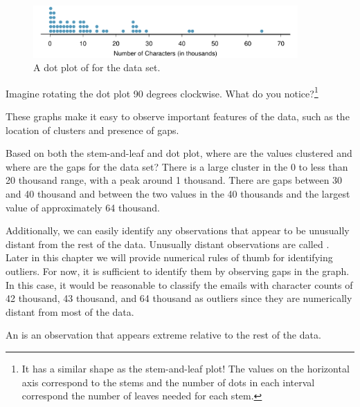 \begin{figure}[h]
   \centering
   \includegraphics[width=0.9\textwidth]{ch_summarizing_data/figures/emailCharactersDotPlot/emailCharactersDotPlotStackedRounded}
   \caption{A dot plot of  for the  data set.}
   \label{emailCharactersDotPlotStacked}
\end{figure}

\begin{exercise}
Imagine rotating the dot plot 90 degrees clockwise. What do you notice?\footnote{It has a similar shape as the stem-and-leaf plot! The values on the horizontal axis correspond to the stems and the number of dots in each interval correspond the number of leaves needed for each stem.}
\end{exercise}

These graphs make it easy to observe important features of the data, such as the location of clusters and presence of gaps.

\begin{example}{Based on both the stem-and-leaf and dot plot, where are the values clustered and where are the gaps for the  data set?}
There is a large cluster in the 0 to less than 20 thousand range, with a peak around 1 thousand. There are gaps between 30 and 40 thousand and between the two values in the 40 thousands and the largest value of approximately 64 thousand.
\end{example}

Additionally, we can easily identify any observations that appear to be unusually distant from the rest of the data. Unusually distant observations are called . Later in this chapter we will provide numerical rules of thumb for identifying outliers. For now, it is sufficient to identify them by observing gaps in the graph. In this case, it would be reasonable to classify the emails with character counts of 42 thousand, 43 thousand, and 64 thousand as outliers since they are numerically distant from most of the data.


\begin{termBox}{
An  is an observation that appears extreme relative to the rest of the data.}
\end{termBox}


